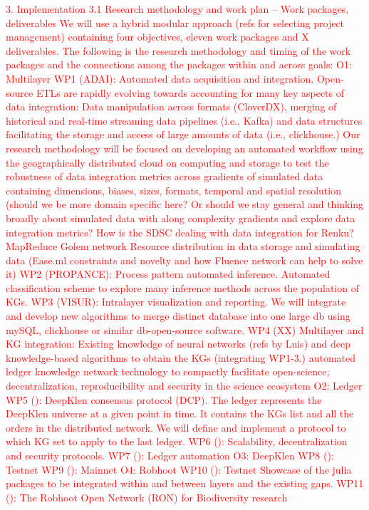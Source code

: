 \documentclass[12pt, a4paper]{article} %
\begin{document}
\begin{itemize}
\begin{itemize}
\begin{itemize}
  \textcolor{red}{3. Implementation 3.1 Research methodology and work
    plan – Work packages, deliverables We will use a hybrid modular
    approach (refs for selecting project management) containing four
    objectives, eleven work packages and X deliverables. The following
    is the research methodology and timing of the work packages and
    the connections among the packages within and across goals: O1:
    Multilayer WP1 (ADAI): Automated data acquisition and
    integration. Open-source ETLs are rapidly evolving towards
    accounting for many key aspects of data integration: Data
    manipulation across formats (CloverDX), merging of historical and
    real-time streaming data pipelines (i.e., Kafka) and data
    structures facilitating the storage and access of large amounts of
    data (i.e., clickhouse.) Our research methodology will be focused
    on developing an automated workflow using the geographically
    distributed cloud on computing and storage to test the robustness
    of data integration metrics across gradients of simulated data
    containing dimensions, biases, sizes, formats, temporal and
    spatial resolution (should we be more domain specific here? Or
    should we stay general and thinking broadly about simulated data
    with along complexity gradients and explore data integration
    metrics? How is the SDSC dealing with data integration for Renku?
    MapReduce Golem network Resource distribution in data storage and
    simulating data (Ease.ml constraints and novelty and how Fluence
    network can help to solve it) WP2 (PROPANCE): Process pattern
    automated inference. Automated classification scheme to explore
    many inference methods across the population of KGs.  WP3 (VISUR):
    Intralayer visualization and reporting. We will integrate and
    develop new algorithms to merge distinct database into one large
    db using mySQL, clickhouse or similar db-open-source software.
    WP4 (XX) Multilayer and KG integration: Existing knowledge of
    neural networks (refs by Luis) and deep knowledge-based algorithms
    to obtain the KGs (integrating WP1-3.)  automated ledger knowledge
    network technology to compactly facilitate open-science,
    decentralization, reproducibility and security in the science
    ecosystem O2: Ledger WP5 (): DeepKlen consensus protocol (DCP).
    The ledger represents the DeepKlen universe at a given point in
    time. It contains the KGs list and all the orders in the
    distributed network. We will define and implement a protocol to
    which KG set to apply to the last ledger.  WP6 (): Scalability,
    decentralization and security protocols.  WP7 (): Ledger
    automation O3: DeepKlen WP8 (): Testnet WP9 (): Mainnet O4:
    Robhoot WP10 (): Testnet Showcase of the julia packages to be
    integrated within and between layers and the existing gaps.  WP11
    (): The Robhoot Open Network (RON) for Biodiversity research}


\end{itemize}
\end{itemize}
\end{itemize}
\end{document}
